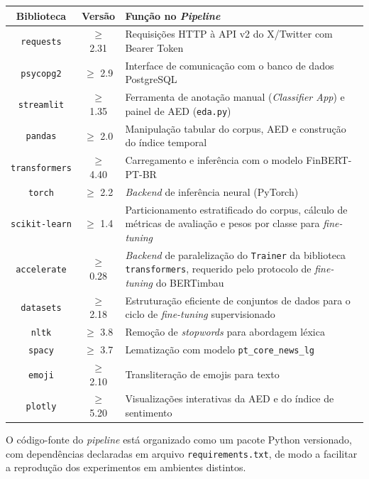 \begin{quadro}[!htb]
	\centering
	\caption{\label{qua:bibliotecas}Principais bibliotecas Python utilizadas no \textit{pipeline} e respectivas funções}
	\begin{tabular}{|c|c|p{8cm}|}
		\hline
		\textbf{Biblioteca} & \textbf{Versão} & \textbf{Função no \textit{Pipeline}} \\
		
		\hline
		\texttt{requests} & $\geq$ 2.31 & Requisições HTTP à API v2 do X/Twitter com Bearer Token \\
		
		\hline
		\texttt{psycopg2} & $\geq$ 2.9 & Interface de comunicação com o banco de dados PostgreSQL \\
		
		\hline
		\texttt{streamlit} & $\geq$ 1.35 & Ferramenta de anotação manual (\textit{Classifier App}) e painel de AED (\texttt{eda.py}) \\
		
		\hline
		\texttt{pandas} & $\geq$ 2.0 & Manipulação tabular do corpus, AED e construção do índice temporal \\
		
		\hline
		\texttt{transformers} & $\geq$ 4.40 & Carregamento e inferência com o modelo FinBERT-PT-BR \\
		
		\hline
		\texttt{torch} & $\geq$ 2.2 & \textit{Backend} de inferência neural (PyTorch) \\
		
		\hline
		\texttt{scikit-learn} & $\geq$ 1.4 & Particionamento estratificado do corpus, cálculo de métricas de avaliação e pesos por classe para \textit{fine-tuning} \\
		
		\hline
		\texttt{accelerate} & $\geq$ 0.28 & \textit{Backend} de paralelização do \texttt{Trainer} da biblioteca \texttt{transformers}, requerido pelo protocolo de \textit{fine-tuning} do BERTimbau \\
		
		\hline
		\texttt{datasets} & $\geq$ 2.18 & Estruturação eficiente de conjuntos de dados para o ciclo de \textit{fine-tuning} supervisionado \\
		
		\hline
		\texttt{nltk} & $\geq$ 3.8 & Remoção de \textit{stopwords} para abordagem léxica \\
		
		\hline
		\texttt{spacy} & $\geq$ 3.7 & Lematização com modelo \texttt{pt\_core\_news\_lg} \\
		
		\hline
		\texttt{emoji} & $\geq$ 2.10 & Transliteração de emojis para texto \\
		
		\hline
		\texttt{plotly} & $\geq$ 5.20 & Visualizações interativas da AED e do índice de sentimento \\
		\hline
	\end{tabular}
\end{quadro}

O código-fonte do \textit{pipeline} está organizado como um pacote Python versionado, com dependências declaradas em arquivo \texttt{requirements.txt}, de modo a facilitar a reprodução dos experimentos em ambientes distintos.